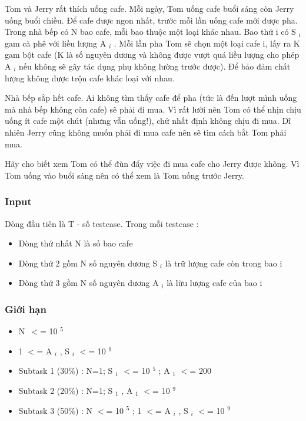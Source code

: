 

Tom và Jerry rất thích uống cafe. Mỗi ngày, Tom uống cafe buổi sáng còn Jerry uống buổi chiều. Để cafe được ngon nhất, trước mỗi lần uống cafe mới được pha. Trong nhà bếp có N bao cafe, mỗi bao thuộc một loại khác nhau. Bao thứ i có S $_ i $ gam cà phê với liều lượng A $_ i $ . Mỗi lần pha Tom sẽ chọn một loại cafe i, lấy ra K gam bột cafe (K là số nguyên dương và không được vượt quá liều lượng cho phép A $_ i $ nếu không sẽ gây tác dụng phụ không lường trước được). Để bảo đảm chất lượng không được trộn cafe khác loại với nhau.

Nhà bếp sắp hết cafe. Ai không tìm thấy cafe để pha (tức là đến lượt mình uống mà nhà bếp không còn cafe) sẽ phải đi mua. Vì rất lười nên Tom có thể nhịn chịu uống ít cafe một chút (nhưng vẫn uống!), chứ nhất định không chịu đi mua. Dĩ nhiên Jerry cũng không muốn phải đi mua cafe nên sẽ tìm cách bắt Tom phải mua.

Hãy cho biết xem Tom có thể đùn đẩy việc đi mua cafe cho Jerry được không. Vì Tom uống vào buổi sáng nên có thể xem là Tom uống trước Jerry.

\subsubsection{Input}

Dòng đầu tiên là T - số testcase. Trong mỗi testcase :
\begin{itemize}
	\item Dòng thứ nhất N là số bao cafe
	\item Dòng thứ 2 gồm N số nguyên dương S $_ i $ là trữ lượng cafe còn trong bao i
	\item Dòng thứ 3 gồm N số nguyên dương A $_ i $ là lừu lượng cafe của bao i
\end{itemize}

\subsubsection{Giới hạn}
\begin{itemize}
	\item N $<$= 10 $^ 5 $
	\item 1 $<$= A $_ i $ , S $_ i $ $<$= 10 $^ 9 $
	\item Subtask 1 (30\%) : N=1; S $_ 1 $ $<$= 10 $^ 5 $ ; A $_ 1 $ $<$= 200
	\item Subtask 2 (20\%) : N=1; S $_ 1 $ , A $_ 1 $ $<$= 10 $^ 9 $
	\item Subtask 3 (50\%) : N $<$= 10 $^ 5 $ ; 1 $<$= A $_ i $ , S $_ i $ $<$= 10 $^ 9 $
\end{itemize}

